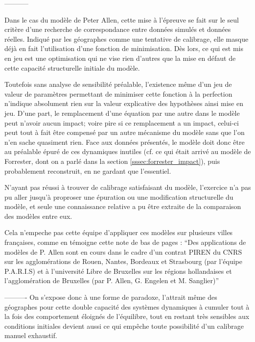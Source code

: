-----------


Dans le cas du modèle de Peter Allen, cette mise à l'épreuve se fait sur le seul critère d'une recherche de correspondance entre données simulés et données réelles. Indiqué par les géographes comme une tentative de calibrage, elle masque déjà en fait l'utilisation d'une fonction de minimisation. Dès lors, ce qui est mis en jeu est une optimisation qui ne vise rien d'autres que la mise en défaut de cette capacité structurelle initiale du modèle.

Toutefois sans analyse de sensibilité préalable, l'existence même d'un jeu de valeur de paramètres permettant de minimiser cette fonction à la perfection n'indique absolument rien sur la valeur explicative des hypothèses ainsi mise en jeu. D'une part, le remplacement d'une équation par une autre dans le modèle peut n'avoir aucun impact; voire pire si ce remplacement a un impact, celui-ci peut tout à fait être compensé par un autre mécanisme du modèle sans que l'on n'en sache quasiment rien. Face aux données présentés, le modèle doit donc être au préalable épuré de ces dynamiques inutiles (cf. ce qui était arrivé au modèle de Forrester, dont on a parlé dans la section \ref{sssec:forrester_impact}), puis probablement reconstruit, en ne gardant que l'essentiel.

N'ayant pas réussi à trouver de calibrage satisfaisant du modèle, l'exercice n'a pas pu aller jusqu'à proproser une épuration ou une modification structurelle du modèle, et seule une connaissance relative a pu être extraite de la comparaison des modèles entre eux.

Cela n'empeche pas cette équipe d'appliquer ces modèles sur plusieurs villes françaises, comme en témoigne cette note de bas de pages \autocite[134]{Pumain1984} : \enquote{Des applications de modèles de P. Allen sont en cours dans le cadre d'un contrat PIREN du CNRS sur les agglomérations de Rouen, Nantes, Bordeaux et Strasbourg (par l'équipe P.A.R.I.S) et à l'université Libre de Bruxelles sur les régions hollandaises et l'agglomération de Bruxelles (par P. Allen, G. Engelen et M. Sanglier)}



----------
On s'expose donc à une forme de paradoxe, l'attrait même des géographes pour cette double capacité des systèmes dynamiques à cumuler tout à la fois des comportement éloignés de l'équilibre, tout en restant très sensibles aux conditions initiales devient aussi ce qui empêche toute possibilité d'un calibrage manuel exhaustif.

